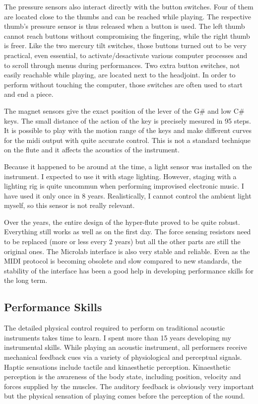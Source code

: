 The pressure sensors also interact directly with the button switches. Four of them are located close to the thumbs and can be reached while playing. The respective thumb's pressure sensor is thus released when a button is used. The left thumb cannot reach buttons without compromising the fingering, while the right thumb is freer. Like the two mercury tilt switches, those buttons turned out to be very practical, even essential, to activate/desactivate various computer processes and to scroll through menus during performances. Two extra button switches, not easily reachable while playing, are located next to the headjoint. In order to perform without touching the computer, those switches are often used to start and end a piece. 
 
The magnet sensors give the exact position of the lever of the G\# and low C\# keys. The small distance of the action of the key is precisely mesured in 95 steps. It is possible to play with the motion range of the keys and make different curves for the midi output with quite accurate control. This is not a standard technique on the flute and it  affects the acoustics of the instrument.
 
Because it happened to be around at the time, a light sensor was installed on the instrument. I expected to use it with stage lighting.  However, staging with a lighting rig is quite uncommun when performing improvised electronic music. I have used it only once in 8 years. Realistically, I cannot control the ambient light myself, so this sensor is not really relevant.

Over the years, the entire design of the hyper-flute proved to be quite robust. Everything still works as well as on the first day. The force sensing resistors need to be replaced (more or less every 2 years) but all the other parts are still the original ones.  The Microlab interface is also very stable and reliable. Even as the MIDI protocol is becoming obsolete and slow compared to new standards, the stability of the interface has been a good help in developing performance skills for the long term.

\subsection{Performance Skills}

The detailed physical control required to perform on traditional acoustic instruments takes time to learn. I spent more than 15 years developing my instrumental skills. While playing an acoustic instrument, all performers receive mechanical feedback cues via a variety of physiological and perceptual signals. Haptic sensations include tactile and kinaesthetic perception. Kinaesthetic perception is the awareness of the body state, including position, velocity and forces supplied by the muscles. The auditory feedback is obviously very important but the physical sensation of playing comes before the perception of the sound. 

